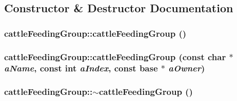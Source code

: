 \subsection{Constructor \& Destructor Documentation}
\hypertarget{classcattle_feeding_group_a5291be5d6b47e4250cf670b16735924d}{
\subsubsection[{cattleFeedingGroup}]{\setlength{\rightskip}{0pt plus 5cm}cattleFeedingGroup::cattleFeedingGroup ()}}
\label{classcattle_feeding_group_a5291be5d6b47e4250cf670b16735924d}
\hypertarget{classcattle_feeding_group_a8e091ad706e908bd22d1fe11ba7b603c}{
\subsubsection[{cattleFeedingGroup}]{\setlength{\rightskip}{0pt plus 5cm}cattleFeedingGroup::cattleFeedingGroup (const char $\ast$ {\em aName}, \/  const int {\em aIndex}, \/  const {\bf base} $\ast$ {\em aOwner})}}
\label{classcattle_feeding_group_a8e091ad706e908bd22d1fe11ba7b603c}
\hypertarget{classcattle_feeding_group_a3375159bc6fe10277b6bd26070b8d353}{
\subsubsection[{$\sim$cattleFeedingGroup}]{\setlength{\rightskip}{0pt plus 5cm}cattleFeedingGroup::$\sim$cattleFeedingGroup ()}}
\label{classcattle_feeding_group_a3375159bc6fe10277b6bd26070b8d353}



